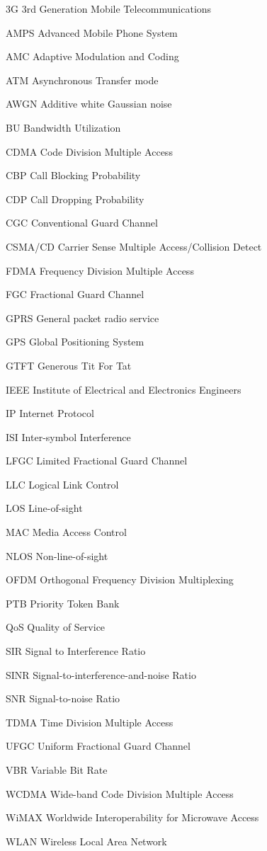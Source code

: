 \begin{denotation}
\item[3G] 3rd Generation Mobile Telecommunications
\item[AMPS] Advanced Mobile Phone System
\item[AMC] Adaptive Modulation and Coding
\item[ATM]Asynchronous Transfer mode
\item[AWGN]  Additive white Gaussian noise
\item[BU] Bandwidth Utilization
\item[CDMA] Code Division Multiple Access 
\item[CBP] Call Blocking Probability
\item[CDP] Call Dropping Probability
\item[CGC] Conventional Guard Channel
\item[CSMA/CD] Carrier Sense Multiple Access/Collision Detect
\item[FDMA]Frequency Division Multiple Access
\item[FGC] Fractional Guard Channel
  \item[GPRS] General packet radio service
  \item[GPS] Global Positioning System
  \item[GTFT] Generous Tit For Tat
  \item[IEEE] Institute of Electrical and Electronics Engineers
  \item[IP] Internet Protocol
  \item[ISI] Inter-symbol Interference
  \item[LFGC] Limited Fractional Guard Channel
  \item[LLC] Logical Link Control
  \item[LOS] Line-of-sight
  \item[MAC] Media Access Control
  \item[NLOS] Non-line-of-sight
  \item[OFDM] Orthogonal Frequency Division Multiplexing 
  \item[PTB] Priority Token Bank
  \item[QoS] Quality of Service
  \item[SIR] Signal to Interference Ratio
  \item[SINR]Signal-to-interference-and-noise Ratio
  \item[SNR] Signal-to-noise Ratio
  \item[TDMA]Time Division Multiple Access
  \item[UFGC] Uniform Fractional Guard Channel
  \item[VBR] Variable Bit Rate
  \item[WCDMA] Wide-band Code Division Multiple Access
  \item[WiMAX] Worldwide Interoperability for Microwave Access
  \item[WLAN] Wireless Local Area Network

\end{denotation}
